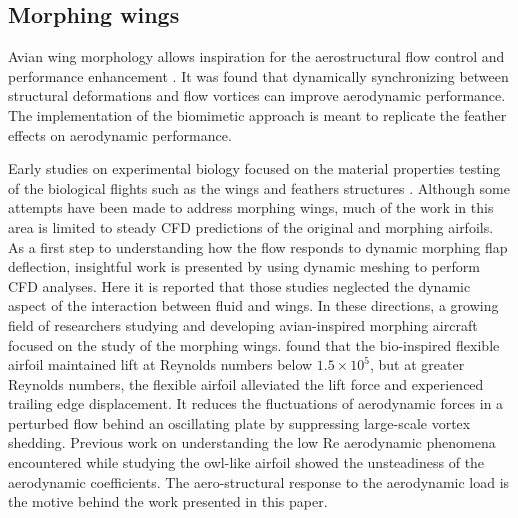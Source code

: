 \documentclass[conf]{new-aiaa}
\begin{document}
\subsection{Morphing wings}\label{Morphing Wings}

Avian wing morphology allows inspiration for the aerostructural flow control and performance enhancement \cite{Wong2022FlexibleMorphing}.
%
It was found that dynamically synchronizing between structural deformations and flow vortices can improve aerodynamic performance.
%
The implementation of the biomimetic approach is meant to replicate the feather effects on aerodynamic performance.

Early studies on experimental biology focused on the material properties testing of the biological flights such as the wings and feathers structures \cite{Bachmann2012FlexuralProperties}.
%
Although some attempts have been made to address morphing wings, much of the work in this area is limited to steady CFD predictions of the original and morphing airfoils.
%
As a first step to understanding how the flow responds to dynamic morphing flap deflection, insightful work is presented by \citet{Abdessemed2018} using dynamic meshing to perform CFD analyses.
%
Here it is reported that those studies neglected the dynamic aspect of the interaction between fluid and wings.
%
In these directions, a growing field of researchers studying and developing avian-inspired morphing aircraft focused on the study of the morphing wings.
%
\citet{gamble2020load} found that the bio-inspired flexible airfoil maintained lift at Reynolds numbers below $1.5\times 10^5$, but at greater Reynolds numbers, the flexible airfoil alleviated the lift force and experienced trailing edge displacement.
%
It reduces the fluctuations of aerodynamic forces in a perturbed flow behind an oscillating plate by suppressing large-scale vortex shedding.
%
Previous work on understanding the low Re aerodynamic phenomena encountered while studying the owl-like airfoil \cite{Boughou2022} showed the unsteadiness of the aerodynamic coefficients.
%
The aero-structural response to the aerodynamic load is the motive behind the work presented in this paper.
\end{document}
